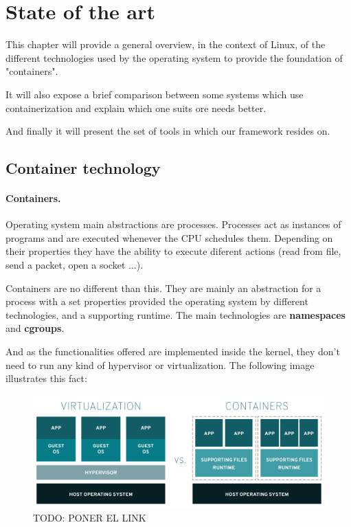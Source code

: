 \clearpage\section{State of the art}
This chapter will provide a general overview, in the context of Linux, of the different technologies used by the operating system to provide the foundation of "containers".

It will also expose a brief comparison between some systems which use containerization and explain which one suits ore needs better.

And finally it will present the set of tools in which our framework resides on.

\subsection{Container technology}
\paragraph{Containers.} Operating system main abstractions are processes. Processes act as instances of programs and are executed whenever the CPU schedules them. Depending on their properties they have the ability to execute diferent actions (read from file, send a packet, open a socket ...).

Containers are no different than this. They are mainly an abstraction for a process with a set properties provided the operating system by different technologies, and a supporting runtime. The main technologies are \textbf{namespaces} and \textbf{cgroups}.

And as the functionalities offered are implemented inside the kernel, they don't need to run any kind of hypervisor or virtualization. The following image illustrates this fact:

\begin{figure}[H]
	\label{fig:Virtualization vs Containers}
	\centering
	\includegraphics[width=\textwidth]{img/02/02-state-virtualization-vs-containers.png}
	\caption[Virtualization vs Containers]{\footnotesize{TODO: PONER EL LINK}}
\end{figure}

